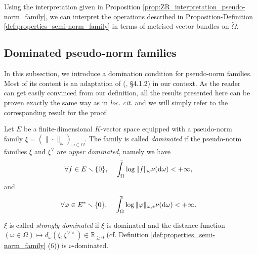 \documentclass [11pt,reqno]{amsart}
\def\bR{{\mathbb{R}}}
\newcommand{\1}{\mathmybb{1}}
\def\cA{{\mathcal{A}}}
\def\cL{{\mathcal{L}}}
\def\diff{\mathrm{d}}
\def\tilde{\widetilde}
\def\setminus{\smallsetminus}
\def\upint{\mathchoice%
    {\mkern13mu\overline{\vphantom{\intop}\mkern7mu}\mkern-20mu}%
    {\mkern7mu\overline{\vphantom{\intop}\mkern7mu}\mkern-14mu}%
    {\mkern7mu\overline{\vphantom{\intop}\mkern7mu}\mkern-14mu}%
    {\mkern7mu\overline{\vphantom{\intop}\mkern7mu}\mkern-14mu}%
  \int}
\begin{document}
\begin{remark}
\label{rem:ZR_interpretation_algebraic_operations_pseudo-norm_families}
Using the interpretation given in Proposition \ref{prop:ZR_interpretation_pseudo-norm_family}, we can interpret the operations described in Proposition-Definition \ref{def:properties_semi-norm_family} in terms of metrised vector bundles on $\tilde{\Omega}$.
\end{remark}

\subsection{Dominated pseudo-norm families}
\label{sub:dominated_semi-norm_families}

In this subsection, we introduce a domination condition for pseudo-norm families. Most of its content is an adaptation of (\cite{ChenMori}, \S 4.1.2) in our context. As the reader can get easily convinced from our definition, all the results presented here can be proven exactly the same way as in \emph{loc. cit.} and we will simply refer to the corresponding result for the proof. %

\begin{definition}
\label{def:dominated_semi-norm_family}
Let $E$ be a finite-dimensional $K$-vector space equipped with a pseudo-norm family $\xi =(\|\cdot\|_\omega)_{\omega\in \Omega}$. The family is called \emph{dominated} if the pseudo-norm families $\xi$ and $\xi^{\vee}$ are \emph{upper dominated}, namely we have 
\begin{align*}
\forall f\in E\setminus\{0\},\quad\upint_{\Omega} \log \|f\|_\omega \nu(\diff \omega) < +\infty,
\end{align*}
and
\begin{align*}
\forall \varphi\in E^{\ast}\setminus\{0\},\quad\upint_{\Omega} \log \|\varphi\|_{\omega,\ast} \nu(\diff \omega) < +\infty.
\end{align*}

$\xi$ is called \emph{strongly dominated} if $\xi$ is dominated and the distance function $(\omega\in\Omega) \mapsto d_{\omega}(\xi,\xi^{\vee\vee})\in \bR_{\geq 0}$ (cf. Definition \ref{def:properties_semi-norm_family} (6)) is $\nu$-dominated.  
\end{definition}
\end{document}
